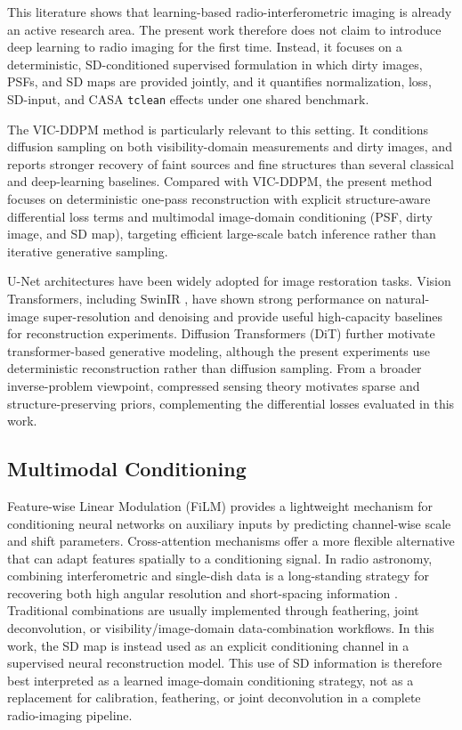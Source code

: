 \documentclass[twocolumn]{aastex631}
\begin{document}
This literature shows that learning-based radio-interferometric imaging is already an active research area.
The present work therefore does not claim to introduce deep learning to radio imaging for the first time.
Instead, it focuses on a deterministic, SD-conditioned supervised formulation in which dirty images, PSFs, and SD maps are provided jointly, and it quantifies normalization, loss, SD-input, and CASA \texttt{tclean} effects under one shared benchmark.

The VIC-DDPM method \citep{Wang2023VICDDPM} is particularly relevant to this setting.
It conditions diffusion sampling on both visibility-domain measurements and dirty images, and reports stronger recovery of faint sources and fine structures than several classical and deep-learning baselines.
Compared with VIC-DDPM, the present method focuses on deterministic one-pass reconstruction with explicit structure-aware differential loss terms and multimodal image-domain conditioning (PSF, dirty image, and SD map), targeting efficient large-scale batch inference rather than iterative generative sampling.

U-Net architectures \citep{Ronneberger2015} have been widely adopted for image restoration tasks.
Vision Transformers, including SwinIR \citep{Liang2021}, have shown strong performance on natural-image super-resolution and denoising and provide useful high-capacity baselines for reconstruction experiments.
Diffusion Transformers (DiT) \citep{Peebles2023} further motivate transformer-based generative modeling, although the present experiments use deterministic reconstruction rather than diffusion sampling.
From a broader inverse-problem viewpoint, compressed sensing theory \citep{Candes2006,Donoho2006} motivates sparse and structure-preserving priors, complementing the differential losses evaluated in this work.

\subsection{Multimodal Conditioning}

Feature-wise Linear Modulation (FiLM) \citep{Perez2018} provides a lightweight mechanism for conditioning neural networks on auxiliary inputs by predicting channel-wise scale and shift parameters.
Cross-attention mechanisms \citep{Vaswani2017} offer a more flexible alternative that can adapt features spatially to a conditioning signal.
In radio astronomy, combining interferometric and single-dish data is a long-standing strategy for recovering both high angular resolution and short-spacing information \citep{Plunkett2023}.
Traditional combinations are usually implemented through feathering, joint deconvolution, or visibility/image-domain data-combination workflows.
In this work, the SD map is instead used as an explicit conditioning channel in a supervised neural reconstruction model.
This use of SD information is therefore best interpreted as a learned image-domain conditioning strategy, not as a replacement for calibration, feathering, or joint deconvolution in a complete radio-imaging pipeline.
\end{document}
